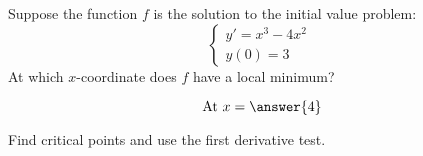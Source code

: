 \documentclass{ximera}
\author{Bobby Ramsey}
\begin{document}
\begin{exercise}
Suppose the function $f$ is the solution to the initial value problem:
\[  \begin{cases}
	y' = x^3 - 4x^2\\
	y(0) = 3
\end{cases}\]
At which $x$-coordinate does $f$ have a local minimum?

\[ \text{ At } x = \answer{4} \]
\begin{hint}
	Find critical points and use the first derivative test.
\end{hint}
\end{exercise}
\end{document}
